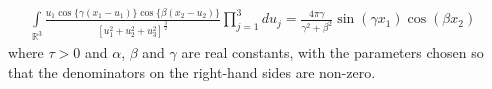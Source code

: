 \documentclass[11pt]{jfm}
\numberwithin{equation}{section}
\begin{document}
\begin{eqnarray}
\label{D14}
\int\limits_{\mathbb{R}^3 }{\frac{{u_1\cos\{\gamma\left(x_1-u_1\right)\}\cos\{\beta\left(x_2-u_2\right)\}}}{{\left[ u_1^2+u_2^2+u_3^2 \right]^{\frac{3}{2}} }}}\prod\limits_{j = 1}^3 {du_j }=\frac{4\pi\gamma}{\gamma^2+\beta^2}\sin\left(\gamma x_1\right)\cos\left(\beta x_2\right)\quad
\end{eqnarray}
where $\tau>0$ and $\alpha$, $\beta$ and $\gamma$ are real constants, with the parameters chosen so that the denominators on the right-hand sides are non-zero.


\end{document}

